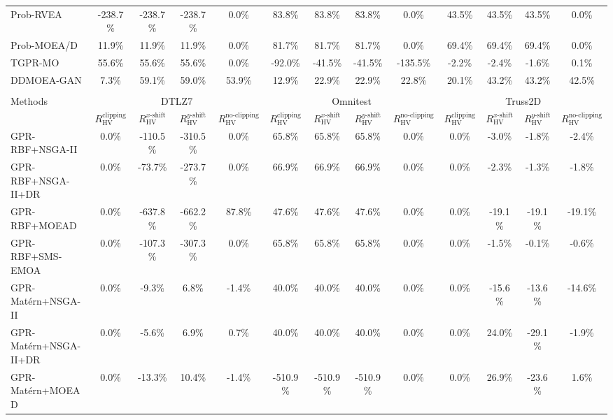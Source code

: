 \begin{table}[htbp]
{\begin{tabular}{l c c c c c c c c c c c c}
Prob-RVEA & -238.7\% & -238.7\% & -238.7\% & 0.0\% & 83.8\% & 83.8\% & 83.8\% & 0.0\% & 43.5\% & 43.5\% & 43.5\% & 0.0\% \\
Prob-MOEA/D & 11.9\% & 11.9\% & 11.9\% & 0.0\% & 81.7\% & 81.7\% & 81.7\% & 0.0\% & 69.4\% & 69.4\% & 69.4\% & 0.0\% \\
TGPR-MO & 55.6\% & 55.6\% & 55.6\% & 0.0\% & -92.0\% & -41.5\% & -41.5\% & -135.5\% & -2.2\% & -2.4\% & -1.6\% & 0.1\% \\
DDMOEA-GAN & 7.3\% & 59.1\% & 59.0\% & 53.9\% & 12.9\% & 22.9\% & 22.9\% & 22.8\% & 20.1\% & 43.2\% & 43.2\% & 42.5\% \\
\hline
\multicolumn{13}{c}{} \\
\hline
Methods & \multicolumn{4}{c}{DTLZ7} & \multicolumn{4}{c}{Omnitest} & \multicolumn{4}{c}{Truss2D} \\
\cmidrule(lr){2-5} \cmidrule(lr){6-9} \cmidrule(lr){10-13}
 & $R_{\mathrm{HV}}^{\mathrm{clipping}}$ & $R_{\mathrm{HV}}^{x\text{-}\mathrm{shift}}$ & $R_{\mathrm{HV}}^{y\text{-}\mathrm{shift}}$ & $R_{\mathrm{HV}}^{\mathrm{no\text{-}clipping}}$ & $R_{\mathrm{HV}}^{\mathrm{clipping}}$ & $R_{\mathrm{HV}}^{x\text{-}\mathrm{shift}}$ & $R_{\mathrm{HV}}^{y\text{-}\mathrm{shift}}$ & $R_{\mathrm{HV}}^{\mathrm{no\text{-}clipping}}$ & $R_{\mathrm{HV}}^{\mathrm{clipping}}$ & $R_{\mathrm{HV}}^{x\text{-}\mathrm{shift}}$ & $R_{\mathrm{HV}}^{y\text{-}\mathrm{shift}}$ & $R_{\mathrm{HV}}^{\mathrm{no\text{-}clipping}}$ \\
\hline
GPR-RBF+NSGA-II & 0.0\% & -110.5\% & -310.5\% & 0.0\% & 65.8\% & 65.8\% & 65.8\% & 0.0\% & 0.0\% & -3.0\% & -1.8\% & -2.4\% \\
GPR-RBF+NSGA-II+DR & 0.0\% & -73.7\% & -273.7\% & 0.0\% & 66.9\% & 66.9\% & 66.9\% & 0.0\% & 0.0\% & -2.3\% & -1.3\% & -1.8\% \\
GPR-RBF+MOEAD & 0.0\% & -637.8\% & -662.2\% & 87.8\% & 47.6\% & 47.6\% & 47.6\% & 0.0\% & 0.0\% & -19.1\% & -19.1\% & -19.1\% \\
GPR-RBF+SMS-EMOA & 0.0\% & -107.3\% & -307.3\% & 0.0\% & 65.8\% & 65.8\% & 65.8\% & 0.0\% & 0.0\% & -1.5\% & -0.1\% & -0.6\% \\
GPR-Mat\'ern+NSGA-II & 0.0\% & -9.3\% & 6.8\% & -1.4\% & 40.0\% & 40.0\% & 40.0\% & 0.0\% & 0.0\% & -15.6\% & -13.6\% & -14.6\% \\
GPR-Mat\'ern+NSGA-II+DR & 0.0\% & -5.6\% & 6.9\% & 0.7\% & 40.0\% & 40.0\% & 40.0\% & 0.0\% & 0.0\% & 24.0\% & -29.1\% & -1.9\% \\
GPR-Mat\'ern+MOEAD & 0.0\% & -13.3\% & 10.4\% & -1.4\% & -510.9\% & -510.9\% & -510.9\% & 0.0\% & 0.0\% & 26.9\% & -23.6\% & 1.6\% \\

\end{tabular}}
\end{table}
